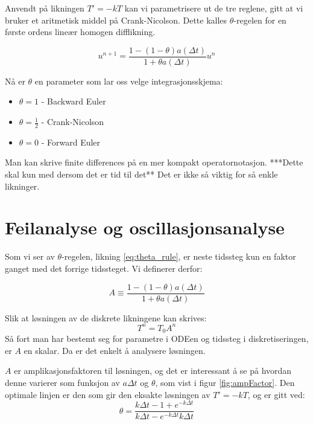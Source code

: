 \documentclass[a4paper, 10pt]{article}
\begin{document}
Anvendt på likningen $T' = -kT$ kan vi parametrisere ut de tre reglene, gitt at vi bruker et aritmetisk middel på Crank-Nicolson. Dette kalles $\theta$-regelen for en første ordens lineær homogen difflikning.

\begin{equation}
u^{n+1} = \frac{1 - (1-\theta) a(\Delta t)}{1 + \theta a(\Delta t)}u^n
\label{eq:theta_rule}
\end{equation}

Nå er $\theta$ en parameter som lar oss velge integrasjonsskjema:
\begin{itemize}
\item $\theta = 1$ - Backward Euler
\item $\theta = \frac{1}{2}$ - Crank-Nicolson
\item $\theta = 0$ - Forward Euler
\end{itemize}

Man kan skrive finite differences på en mer kompakt operatornotasjon. ***Dette skal kun med dersom det er tid til det** Det er ikke så viktig for så enkle likninger. 

\section{Feilanalyse og oscillasjonsanalyse}
Som vi ser av $\theta$-regelen, likning \ref{eq:theta_rule}, er neste tidssteg kun en faktor ganget med det forrige tidssteget. Vi definerer derfor:

\begin{equation}
	A \equiv \frac{1 - (1-\theta) a(\Delta t)}{1 + \theta a(\Delta t)}
\end{equation}

Slik at løsningen av de diskrete likningene kan skrives:
\begin{equation}
	T^n = T_0A^n
\end{equation}
Så fort man har bestemt seg for parametre i ODEen og tidssteg i diskretiseringen, er $A$ en skalar. Da er det enkelt å analysere løsningen. 

$A$ er amplikasjonsfaktoren til løsningen, og det er interessant å se på hvordan denne varierer som funksjon av $a\Delta t$ og $\theta$, som vist i figur \ref{fig:ampFactor}. Den optimale linjen er den som gir den eksakte løsningen av $T'=-kT$, og er gitt ved:
\begin{equation}
	\theta = \frac{k\Delta t - 1 + e^{-k\Delta t}}{k\Delta t - e^{-k\Delta t}k\Delta t}
\end{equation}
\end{document}
